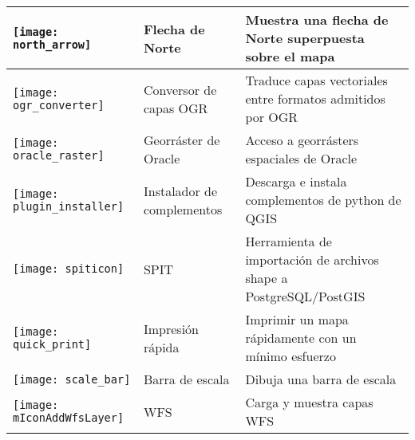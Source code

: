 \begin{minipage}{\textwidth}
\begin{table}[H]
\begin{tabular}{|l|l|p{4in}|}
\hline
\texttt{[image: north\_arrow]}
& Flecha de Norte \index{plugins!north arrow}& Muestra una flecha de Norte superpuesta sobre el mapa\\
\hline
\texttt{[image: ogr\_converter]}
 & Conversor de capas OGR \index{plugins!OGR converter} & Traduce capas vectoriales entre formatos admitidos por OGR\\
\hline
\texttt{[image: oracle\_raster]}
 & Georráster de Oracle \index{plugins!georaster}& Acceso a georrásters espaciales de Oracle\\
\hline
\texttt{[image: plugin\_installer]}
 & Instalador de complementos \index{plugins!Plugin Installer} & Descarga e instala complementos de python de QGIS\\
\hline
\texttt{[image: spiticon]}
 & SPIT \index{plugins!spit}& Herramienta de importación de archivos shape a PostgreSQL/PostGIS \\
\hline
\texttt{[image: quick\_print]}
 & Impresión rápida \index{plugins!quick print}& Imprimir un mapa rápidamente con un mínimo esfuerzo \\
\hline
\texttt{[image: scale\_bar]}
 & Barra de escala \index{plugins!scalebar}& Dibuja una barra de escala\\
\hline
\texttt{[image: mIconAddWfsLayer]}
 & WFS & Carga y muestra capas WFS \\
\hline
\end{tabular}
\end{table}
\end{minipage}

\normalsize

\begin{Tip}\caption{\textsc{Configuración de complementos guardada en proyecto}}
\end{Tip}
